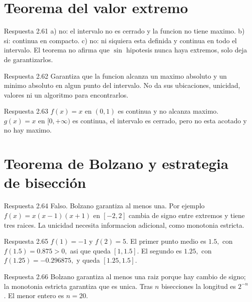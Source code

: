 \documentclass[10pt,a4paper,oneside,openany]{book}
\begin{document}
\section{Teorema del valor extremo}
\begin{PSevenAnswerFixed}{Respuesta 2.61}
a) no: el intervalo no es cerrado y la funcion no tiene maximo. b) si: continua en compacto. c) no: ni siquiera esta definida y continua en todo el intervalo. El teorema no afirma que \(\sin\) hipotesis nunca haya extremos, solo deja de garantizarlos.
\end{PSevenAnswerFixed}
\begin{PSevenAnswerFixed}{Respuesta 2.62}
Garantiza que la funcion alcanza un maximo absoluto y un minimo absoluto en algun punto del intervalo. No da sus ubicaciones, unicidad, valores ni un algoritmo para encontrarlos.
\end{PSevenAnswerFixed}
\begin{PSevenAnswerFixed}{Respuesta 2.63}
\(f(x)=x\) en \((0,1)\) es continua y no alcanza maximo. \(g(x)=x\) en \([0,+\infty )\) es continua, el intervalo es cerrado, pero no esta acotado y no hay maximo.
\end{PSevenAnswerFixed}
\section{Teorema de Bolzano y estrategia de bisección}
\begin{PSevenAnswerFixed}{Respuesta 2.64}
Falso. Bolzano garantiza al menos una. Por ejemplo \(f(x)=x(x-1)(x+1)\) en \([-2,2]\) cambia de signo entre extremos y tiene tres raices. La unicidad necesita informacion adicional, como monotonia estricta.
\end{PSevenAnswerFixed}
\begin{PSevenAnswerFixed}{Respuesta 2.65}
\(f(1)=-1\) y \(f(2)=5\). El primer punto medio es \(1.5,\) con \(f(1.5)=0.875>0,\) asi que queda \([1,1.5]\). El segundo es \(1.25,\) con \(f(1.25)=-0.296875,\) y queda \([1.25,1.5]\).
\end{PSevenAnswerFixed}
\begin{PSevenAnswerFixed}{Respuesta 2.66}
Bolzano garantiza al menos una raiz porque hay cambio de signo; la monotonia estricta garantiza que es unica. Tras \(n\) bisecciones la longitud es \(2^{-n}\). El menor entero es \(n=20\).
\end{PSevenAnswerFixed}
\end{document}
